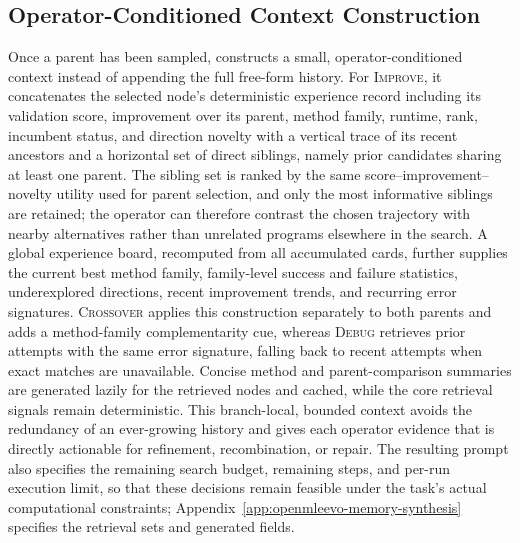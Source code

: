 \subsection{Operator-Conditioned Context Construction}
Once a parent has been sampled, \openmleevo{} constructs a small, operator-conditioned context instead of appending the full free-form history. For \textsc{Improve}, it concatenates the selected node's deterministic experience record including its validation score, improvement over its parent, method family, runtime, rank, incumbent status, and direction novelty with a vertical trace of its recent ancestors and a horizontal set of direct siblings, namely prior candidates sharing at least one parent. The sibling set is ranked by the same score--improvement--novelty utility used for parent selection, and only the most informative siblings are retained; the operator can therefore contrast the chosen trajectory with nearby alternatives rather than unrelated programs elsewhere in the search. A global experience board, recomputed from all accumulated cards, further supplies the current best method family, family-level success and failure statistics, underexplored directions, recent improvement trends, and recurring error signatures. \textsc{Crossover} applies this construction separately to both parents and adds a method-family complementarity cue, whereas \textsc{Debug} retrieves prior attempts with the same error signature, falling back to recent attempts when exact matches are unavailable. Concise method and parent-comparison summaries are generated lazily for the retrieved nodes and cached, while the core retrieval signals remain deterministic. This branch-local, bounded context avoids the redundancy of an ever-growing history and gives each operator evidence that is directly actionable for refinement, recombination, or repair. The resulting prompt also specifies the remaining search budget, remaining steps, and per-run execution limit, so that these decisions remain feasible under the task's actual computational constraints; Appendix~\ref{app:openmleevo-memory-synthesis} specifies the retrieval sets and generated fields.


